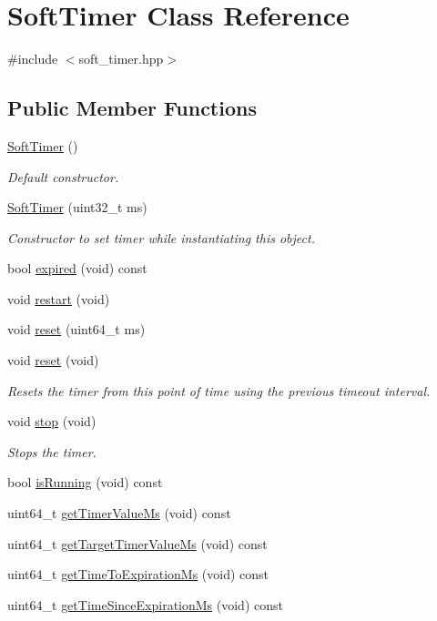 \hypertarget{classSoftTimer}{}\section{Soft\+Timer Class Reference}
\label{classSoftTimer}


{\ttfamily \#include $<$soft\+\_\+timer.\+hpp$>$}

\subsection*{Public Member Functions}
\begin{DoxyCompactItemize}
\item 
\hyperlink{classSoftTimer_af85e03b6431e5c4d7bdbc01ed307a98d}{Soft\+Timer} ()
\begin{DoxyCompactList}\small\item\em Default constructor. \end{DoxyCompactList}\item 
\hyperlink{classSoftTimer_a164d00efe48fbe356c4ed13a2fef4061}{Soft\+Timer} (uint32\+\_\+t ms)
\begin{DoxyCompactList}\small\item\em Constructor to set timer while instantiating this object. \end{DoxyCompactList}\item 
bool \hyperlink{classSoftTimer_aedfee5ede7ca637f49f2c23401024324}{expired} (void) const 
\item 
void \hyperlink{classSoftTimer_ada94dffbd1aa1872dfae5d91d326814c}{restart} (void)
\item 
void \hyperlink{classSoftTimer_a2177823aa1355a6bf131aef556eb31dd}{reset} (uint64\+\_\+t ms)
\item 
void \hyperlink{classSoftTimer_a495e2a21b3fdd35a606e2585ceb7dd28}{reset} (void)
\begin{DoxyCompactList}\small\item\em Resets the timer from this point of time using the previous timeout interval. \end{DoxyCompactList}\item 
void \hyperlink{classSoftTimer_adf5d79e1ed0db66d121f50c84a59431b}{stop} (void)
\begin{DoxyCompactList}\small\item\em Stops the timer. \end{DoxyCompactList}\item 
bool \hyperlink{classSoftTimer_a33f73e69c0a28ff19b7ad353ba8dfaf5}{is\+Running} (void) const 
\item 
uint64\+\_\+t \hyperlink{classSoftTimer_a6956ecddab11d72a552f2eba6f2292d7}{get\+Timer\+Value\+Ms} (void) const 
\item 
uint64\+\_\+t \hyperlink{classSoftTimer_af1f8973d0f3df86c5a11fd550bde9f76}{get\+Target\+Timer\+Value\+Ms} (void) const 
\item 
uint64\+\_\+t \hyperlink{classSoftTimer_ab469e06d3640fc8becd2094dc38b0d5a}{get\+Time\+To\+Expiration\+Ms} (void) const 
\item 
uint64\+\_\+t \hyperlink{classSoftTimer_abd7ffd911c459ae00a3141d4409176ff}{get\+Time\+Since\+Expiration\+Ms} (void) const 
\end{DoxyCompactItemize}
